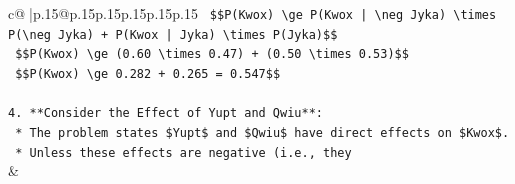\documentclass{article}
\begin{document}
{\begin{supertabular}{c@{$\;$}|p{.15\linewidth}@{}p{.15\linewidth}p{.15\linewidth}p{.15\linewidth}p{.15\linewidth}p{.15\linewidth}}
{{{\texttt{        \$\$P(Kwox) \textbackslash{}ge P(Kwox | \textbackslash{}neg Jyka) \textbackslash{}times P(\textbackslash{}neg Jyka) + P(Kwox | Jyka) \textbackslash{}times P(Jyka)\$\$} \\
\texttt{        \$\$P(Kwox) \textbackslash{}ge (0.60 \textbackslash{}times 0.47) + (0.50 \textbackslash{}times 0.53)\$\$} \\
\texttt{        \$\$P(Kwox) \textbackslash{}ge 0.282 + 0.265 = 0.547\$\$} \\
\\ 
\texttt{4.  **Consider the Effect of Yupt and Qwiu**:} \\
\texttt{    *   The problem states \$Yupt\$ and \$Qwiu\$ have direct effects on \$Kwox\$.} \\
\texttt{    *   Unless these effects are negative (i.e., they} \\
            }
        }
    }
    & \\ \\


\end{supertabular}}
\end{document}
